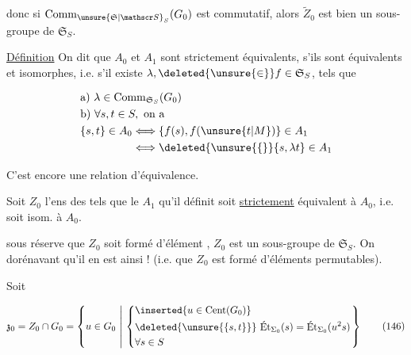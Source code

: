 donc si  $\operatorname{Comm}_{\unsure{\mathfrak S|\mathscr S}_S}(G_0)$ est commutatif, alors $\widetilde Z_0$ est bien un sous-groupe de $\mathfrak S_S$.



\uline{Définition} On dit que $A_0$ et $A_1$ sont strictement équivalents, s'ils sont équivalents et isomorphes, i.e. s'il existe  $\lambda,\deleted{\unsure{\in}}f\in\mathfrak S_S$, tels que

\[
 \begin{aligned}
 &\text{a) }\lambda\in\operatorname{Comm}_{\mathfrak S_S}(G_0)\\
 &\text{b) }\forall s,t\in S,\text{ on a}\\
 &\{s,t\}\in A_0\Longleftrightarrow\{f(s),f(\unsure{t|M})\}\in A_1\\
 &\phantom{\{s,t\}\in A_0}\Longleftrightarrow\deleted{\unsure{\{}}\{s,\lambda t\}\in A_1
 \end{aligned}
\]

 C'est encore une relation d'équivalence.

Soit $Z_0$  l'ens des   tels que   le $A_1$ qu'il définit soit \uline{strictement} équivalent à $A_0$, i.e. soit isom. à $A_0$.

sous réserve que $Z_0$ soit formé d'élément , $Z_0$ est un sous-groupe de $\mathfrak S_S$. On  dorénavant qu'il en est ainsi ! (i.e. que $Z_0$ est formé d'éléments permutables). 



Soit

\[
 \mathfrak z_0=Z_0\cap G_0=
 \left\{u\in G_0\ \middle|\ \left\{
 \begin{aligned}
 &\inserted{u\in\operatorname{Cent}(G_0)}\\
 &\deleted{\unsure{\{s,t\}}}\ \text{Ét}_{\Sigma_0}(s)=\text{Ét}_{\Sigma_0}(u^2s)\\
 &\forall s\in S
 \end{aligned}\right.\right\}
 \tag*{(146)}
\]

